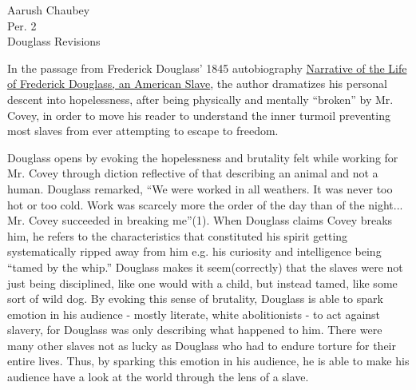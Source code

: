 \documentclass[11pt]{scrartcl}
\title{}
\author{}
\date{}
\begin{document}
\begin{flushright}
Aarush Chaubey\\
Per. 2\\
Douglass Revisions\\
\end{flushright}

In the passage from Frederick Douglass' 1845 autobiography \ul{Narrative
of the Life of Frederick Douglass, an American Slave}, the author dramatizes his personal descent into hopelessness, after being physically and mentally \enquote{broken} by Mr. Covey, in order to move his reader to understand the inner turmoil preventing most slaves from ever attempting to escape to freedom.
\vspace{5mm}


Douglass opens by evoking the hopelessness and brutality felt while working for Mr. Covey through diction reflective of that describing an animal and not a human. Douglass remarked, \enquote{We were worked in all weathers. It was never too hot or too cold. Work was scarcely more the order of the day than of the night... Mr. Covey succeeded in breaking me}(1). When Douglass claims Covey breaks him, he refers to the characteristics that constituted his spirit getting systematically ripped away from him e.g. his curiosity and intelligence being \enquote{tamed by the whip.} Douglass makes it seem(correctly) that the slaves were not just being disciplined, like one would with a child, but instead tamed, like some sort of wild dog. By evoking this sense of brutality, Douglass is able to spark emotion in his audience - mostly literate, white abolitionists - to act against slavery, for Douglass was only describing what happened to him. There were many other slaves not as lucky as Douglass who had to endure torture for their entire lives. Thus, by sparking this emotion in his audience, he is able to make his audience have a look at the world through the lens of a slave.
\vspace{5mm}
\end{document}
